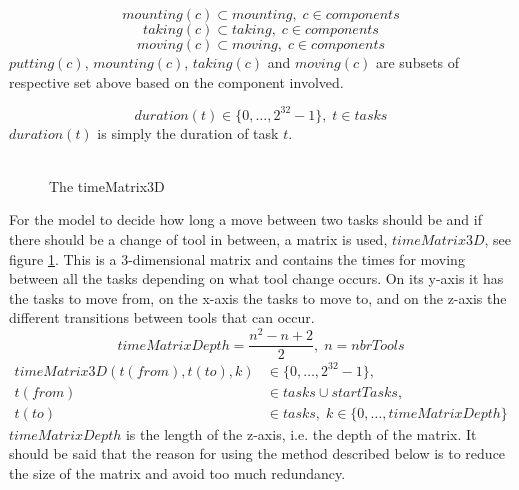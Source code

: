  \begin{equation}\label{eq:36}
 mounting(c) \subset mounting, \; c \in components
 \end{equation}
 \begin{equation}\label{eq:37}
 taking(c) \subset taking, \; c \in components
 \end{equation}
 \begin{equation}\label{eq:38}
 moving(c) \subset moving, \; c \in components
 \end{equation}
 $putting(c)$, $mounting(c)$, $taking(c)$ and $moving(c)$ are subsets of respective set above based on the component involved.
 
 \begin{equation}\label{eq:42}
 duration(t) \in \{0 , \ldots , 2^{32}-1\}, \; t \in tasks
 \end{equation}
 $duration(t)$ is simply the duration of task $t$.
 \\\\
   \begin{figure}
   	\centering
    	
    	\caption{The timeMatrix3D}
    	\label{fig:3d_matrix}
   \end{figure}
 For the model to decide how long a move between two tasks should be and if there should be a change of tool in between, a matrix is used, $timeMatrix3D$, see figure \ref{fig:3d_matrix}. This is a 3-dimensional matrix and contains the times for moving between all the tasks depending on what tool change occurs. On its y-axis it has the tasks to move from, on the x-axis the tasks to move to, and on the z-axis the different transitions between tools that can occur.
 \begin{equation}\label{eq:timeMatrixDepth}
 timeMatrixDepth = \frac{n^2 - n + 2}{2}, \; n = nbrTools
 \end{equation}
  \begin{equation}
  \begin{aligned}\label{eq:44}
  timeMatrix3D(t(from),t(to),k) &\in \{0 , \ldots , 2^{32}-1\},\\
  t(from) &\in tasks \cup startTasks,  \\ 
  t(to) &\in tasks, \; k \in \{0 , \ldots , timeMatrixDepth\}
  \end{aligned}
  \end{equation}
 $timeMatrixDepth$ is the length of the z-axis, i.e. the depth of the matrix. It should be said that the reason for using the method described below is to reduce the size of the matrix and avoid too much redundancy.
 
